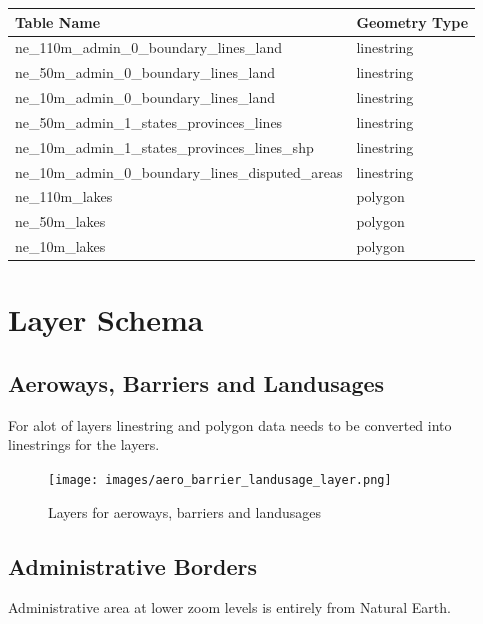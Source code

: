 \begin{flushleft}
    \begin{tabular}{ll}
    \hline
    Table Name                                          & Geometry Type \\
    \hline
    ne\_110m\_admin\_0\_boundary\_lines\_land           & linestring    \\
    ne\_50m\_admin\_0\_boundary\_lines\_land            & linestring    \\
    ne\_10m\_admin\_0\_boundary\_lines\_land            & linestring    \\
    ne\_50m\_admin\_1\_states\_provinces\_lines         & linestring    \\
    ne\_10m\_admin\_1\_states\_provinces\_lines\_shp    & linestring    \\
    ne\_10m\_admin\_0\_boundary\_lines\_disputed\_areas & linestring    \\
    ne\_110m\_lakes                                     & polygon       \\
    ne\_50m\_lakes                                      & polygon       \\
    ne\_10m\_lakes                                      & polygon       \\
    \end{tabular}
\end{flushleft}

\newpage
\section{Layer Schema}\label{layer-schema}

\subsection{Aeroways, Barriers and Landusages}

For alot of layers linestring and polygon data needs to be converted into
linestrings for the layers.

\begin{figure}[h]
  \centering
  \texttt{[image: images/aero\_barrier\_landusage\_layer.png]}
  \caption{Layers for aeroways, barriers and landusages}
\end{figure}

\newpage
\subsection{Administrative Borders}
Administrative area at lower zoom levels is entirely from Natural Earth.

